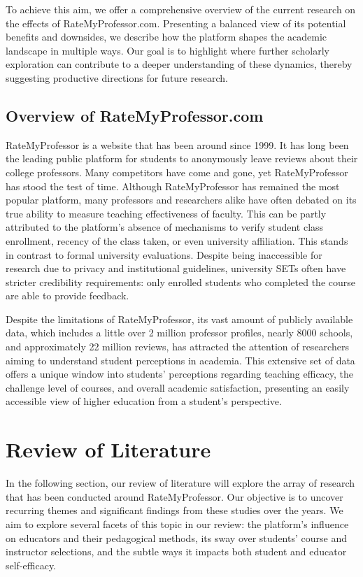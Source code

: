 \documentclass[man, 12pt]{apa7}
\begin{document}
To achieve this aim, we offer a comprehensive overview of the current research on the effects of RateMyProfessor.com. Presenting a balanced view of its potential benefits and downsides, we describe how the platform shapes the academic landscape in multiple ways. Our goal is to highlight where further scholarly exploration can contribute to a deeper understanding of these dynamics, thereby suggesting productive directions for future research.

\subsection{Overview of RateMyProfessor.com}
RateMyProfessor is a website that has been around since 1999. It has long been the leading public platform for students to anonymously leave reviews about their college professors. Many competitors have come and gone, yet RateMyProfessor has stood the test of time. Although RateMyProfessor has remained the most popular platform, many professors and researchers alike have often debated on its true ability to measure teaching effectiveness of faculty. This can be partly attributed to the platform's absence of mechanisms to verify student class enrollment, recency of the class taken, or even university affiliation. This stands in contrast to formal university evaluations. Despite being inaccessible for research due to privacy and institutional guidelines, university SETs often have stricter credibility requirements: only enrolled students who completed the course are able to provide feedback.

Despite the limitations of RateMyProfessor, its vast amount of publicly available data, which includes a little over 2 million professor profiles, nearly 8000 schools, and approximately 22 million reviews, has attracted the attention of researchers aiming to understand student perceptions in academia. This extensive set of data offers a unique window into students' perceptions regarding teaching efficacy, the challenge level of courses, and overall academic satisfaction, presenting an easily accessible view of higher education from a student's perspective.

\section{Review of Literature}
In the following section, our review of literature will explore the array of research that has been conducted around RateMyProfessor. Our objective is to uncover recurring themes and significant findings from these studies over the years. We aim to explore several facets of this topic in our review: the platform’s influence on educators and their pedagogical methods, its sway over students' course and instructor selections, and the subtle ways it impacts both student and educator self-efficacy.
\end{document}
